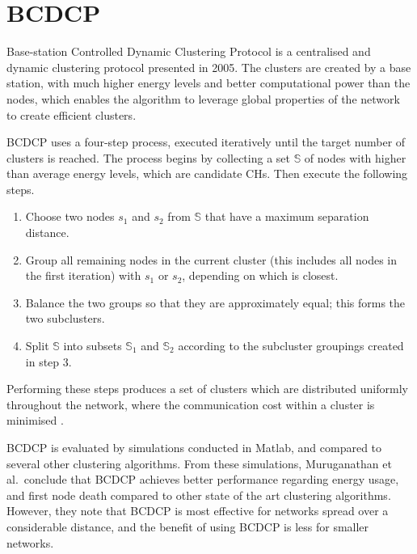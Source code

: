 \section{BCDCP}
\begin{newtext}
Base-station Controlled Dynamic Clustering Protocol \cite{Muruganathan2005-bdccp-centralized-clustering} is a centralised and dynamic clustering protocol presented in 2005. The clusters are created by a base station, with much higher energy levels and better computational power than the nodes, which enables the algorithm to leverage global properties of the network to create efficient clusters. 

BCDCP uses a four-step process, executed iteratively until the target number of clusters is reached. The process begins by collecting a set $\mathbb{S}$ of nodes with higher than average energy levels, which are candidate CHs. Then execute the following steps.

\begin{enumerate}
    \item Choose two nodes $s_1$ and $s_2$ from $\mathbb{S}$ that have a maximum separation distance.
    \item Group all remaining nodes in the current cluster (this includes all nodes in the first iteration) with $s_1$ or $s_2$, depending on which is closest.
    \item Balance the two groups so that they are approximately equal; this forms the two subclusters.
    \item Split $\mathbb{S}$ into subsets $\mathbb{S}_1$ and $\mathbb{S}_2$ according to the subcluster groupings created in step 3.
\end{enumerate}

Performing these steps produces a set of clusters which are distributed uniformly throughout the network, where the communication cost within a cluster is minimised \cite{Muruganathan2005-bdccp-centralized-clustering}.

BCDCP is evaluated by simulations conducted in Matlab, and compared to several other clustering algorithms. From these simulations, Muruganathan et al.~conclude that BCDCP achieves better performance regarding energy usage, and first node death compared to other state of the art clustering algorithms. However, they note that BCDCP is most effective for networks spread over a considerable distance, and the benefit of using BCDCP is less for smaller networks.

\end{newtext}

